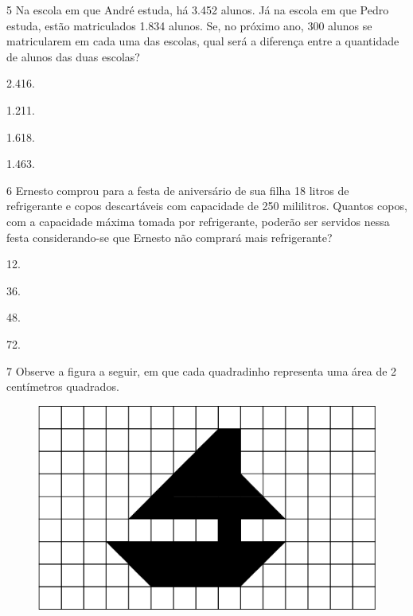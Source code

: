 \num{5} Na escola em que André estuda, há 3.452 alunos. Já na escola em que
Pedro estuda, estão matriculados 1.834 alunos. Se, no próximo ano, 300
alunos se matricularem em cada uma das escolas, qual será a diferença
entre a quantidade de alunos das duas escolas?\enlargethispage{2\baselineskip}

\begin{multicols}{2}
\begin{escolha}
\item
  2.416.
\item
  1.211.
\item
  1.618.
\item
  1.463.
\end{escolha}
\end{multicols}

\num{6} Ernesto comprou para a festa de aniversário de sua filha 18 litros de
refrigerante e copos descartáveis com capacidade de 250 mililitros.
Quantos copos, com a capacidade máxima tomada por refrigerante, poderão
ser servidos nessa festa considerando-se que Ernesto não comprará mais
refrigerante?

\begin{multicols}{2}
\begin{escolha}
\item
  12.
\item
  36.
\item
  48.
\item
  72.
\end{escolha}
\end{multicols}

\num{7} Observe a figura a seguir, em que cada quadradinho representa uma área de 2 centímetros quadrados.

\begin{figure}[htpb!]
\centering
\includegraphics[width=\textwidth]{media/image77.png}
\end{figure}

